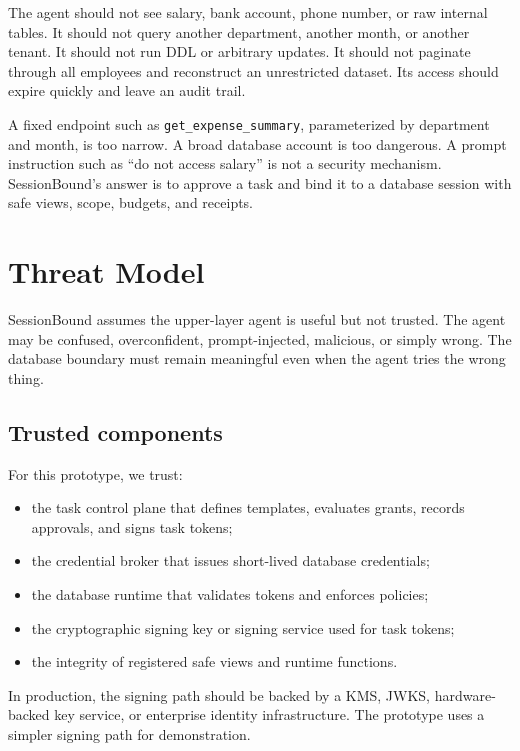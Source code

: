 \documentclass[journal]{IEEEtran}
\providecommand{\tightlist}{%
  \setlength{\itemsep}{0pt}\setlength{\parskip}{0pt}}
\begin{document}
The agent should not see salary, bank account, phone number, or raw
internal tables. It should not query another department, another month,
or another tenant. It should not run DDL or arbitrary updates. It should
not paginate through all employees and reconstruct an unrestricted
dataset. Its access should expire quickly and leave an audit trail.

A fixed endpoint such as \texttt{get\_expense\_summary}, parameterized
by department and month, is too narrow. A broad database account is too
dangerous. A prompt instruction such as ``do not access salary'' is not
a security mechanism. SessionBound's answer is to approve a task and
bind it to a database session with safe views, scope, budgets, and
receipts.


\hypertarget{threat-model}{%
\section{Threat Model}\label{threat-model}}

SessionBound assumes the upper-layer agent is useful but not trusted.
The agent may be confused, overconfident, prompt-injected, malicious, or
simply wrong. The database boundary must remain meaningful even when the
agent tries the wrong thing.

\hypertarget{trusted-components}{%
\subsection{Trusted components}\label{trusted-components}}

For this prototype, we trust:

\begin{itemize}
\tightlist
\item
  the task control plane that defines templates, evaluates grants,
  records approvals, and signs task tokens;
\item
  the credential broker that issues short-lived database credentials;
\item
  the database runtime that validates tokens and enforces policies;
\item
  the cryptographic signing key or signing service used for task tokens;
\item
  the integrity of registered safe views and runtime functions.
\end{itemize}

In production, the signing path should be backed by a KMS, JWKS,
hardware-backed key service, or enterprise identity infrastructure. The
prototype uses a simpler signing path for demonstration.
\end{document}
